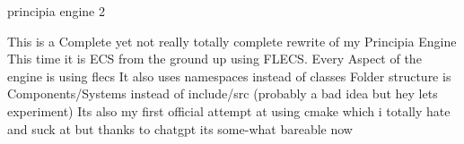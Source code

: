 principia engine 2

This is a Complete yet not really totally complete rewrite of my Principia Engine This time it is ECS from the ground up using FLECS. Every Aspect of the engine is using flecs It also uses namespaces instead of classes Folder structure is Components/\+Systems instead of include/src (probably a bad idea but hey lets experiment) It\textquotesingle{}s also my first official attempt at using cmake which i totally hate and suck at but thanks to chatgpt its some-\/what bareable now 